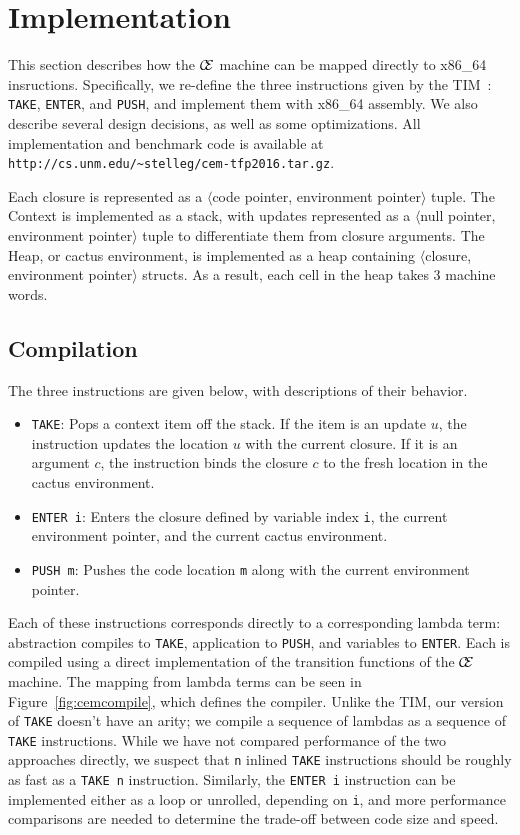 \section{Implementation} \label{sec:impl}

This section describes how the $\mathcal{\mathcal{C} \mskip -4mu \mathcal{E}}$
machine can be mapped directly to x86\_64 insructions. Specifically, we re-define
the three instructions given by the TIM~\cite{TIM}: \texttt{TAKE},
\texttt{ENTER}, and \texttt{PUSH}, and implement them with x86\_64 assembly. We
also describe several design decisions, as well as some optimizations. All
implementation and benchmark code is available at
\texttt{http://cs.unm.edu/\textasciitilde stelleg/cem-tfp2016.tar.gz}.

Each closure is represented as a $\langle$code pointer, environment
pointer$\rangle$ tuple. The
Context is implemented as a stack, with updates represented as a $\langle$null pointer,
environment pointer$\rangle$ tuple to differentiate them from closure arguments. The
Heap, or cactus environment, is implemented as a heap containing $\langle$closure,
environment pointer$\rangle$ structs. As a result, each cell in the heap takes 3
machine words.

\subsection{Compilation}
The three instructions are given below, with descriptions of their behavior. 

\begin{itemize}
\item \texttt{TAKE}: Pops a context item off the stack. If the item is an
update $u$, the instruction updates the location $u$ with the current closure.
If it is an argument $c$, the instruction binds the closure $c$ to the fresh
location in the cactus environment.
\item \texttt{ENTER i}: Enters the closure defined by variable index \texttt{i},
the current environment pointer, and the current cactus environment.  \item
\texttt{PUSH m}: Pushes the code location \texttt{m} along with the
current environment pointer. 
\end{itemize}

Each of these instructions corresponds directly to a corresponding lambda term:
abstraction compiles to \texttt{TAKE}, application to \texttt{PUSH}, and
variables to \texttt{ENTER}. Each is compiled using a direct implementation of
the transition functions of the $\mathcal{\mathcal{C} \mskip -4mu \mathcal{E}}$
machine. The mapping from lambda terms can be seen in
Figure~\ref{fig:cemcompile}, which defines the compiler. Unlike the TIM, our
version of \texttt{TAKE} doesn't have an arity; we compile a sequence of
lambdas as a sequence of \texttt{TAKE} instructions.  While we have not
compared performance of the two approaches directly, we suspect that \texttt{n}
inlined \texttt{TAKE} instructions should be roughly as fast as a \texttt{TAKE
n} instruction.  Similarly, the \texttt{ENTER i} instruction can be implemented
either as a loop or unrolled, depending on \texttt{i}, and more performance
comparisons are needed to determine the trade-off between code size and speed.

